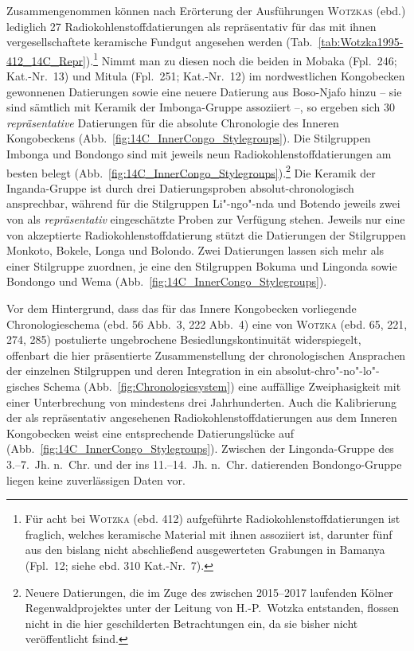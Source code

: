\begin{multicols}{2}
Zusammengenommen können nach Erörterung der Ausführungen \textsc{Wotzkas} (ebd.) lediglich 27 Radiokohlenstoffdatierungen als repräsentativ für das mit ihnen vergesellschaftete keramische Fundgut angesehen werden (Tab.~\ref{tab:Wotzka1995-412_14C_Repr}).\footnote{Für acht bei \textsc{Wotzka} (ebd. 412) aufgeführte Radiokohlenstoffdatierungen ist fraglich, welches keramische Material mit ihnen assoziiert ist, darunter fünf aus den bislang nicht abschließend ausgewerteten Grabungen in Bamanya (Fpl.~12; siehe ebd. 310 Kat.-Nr.~7).} Nimmt man zu diesen noch die beiden in Mobaka (Fpl.~246; Kat.-Nr.~13) und Mitula (Fpl.~251; Kat.-Nr.~12) im nordwestlichen Kongobecken gewonnenen Datierungen sowie eine neuere Datierung aus Boso-Njafo \parencite[Fpl.~149;][]{Kahlheber.2014} hinzu -- sie sind sämtlich mit Keramik der Imbonga-Gruppe assoziiert --, so ergeben sich 30 \textit{repräsentative} Datierungen für die absolute Chronologie des Inneren Kongobeckens (Abb.~\ref{fig:14C_InnerCongo_Stylegroups}). Die Stilgruppen Imbonga und Bondongo sind mit jeweils neun Radiokohlenstoffdatierungen am besten belegt (Abb.~\ref{fig:14C_InnerCongo_Stylegroups}).\footnote{Neuere Datierungen, die im Zuge des zwischen 2015--2017 laufenden Kölner Regenwaldprojektes unter der Leitung von H.-P.~Wotzka entstanden, flossen nicht in die hier geschilderten Betrachtungen ein, da sie bisher nicht veröffentlicht fsind.} Die Keramik der Inganda-Gruppe ist durch drei Datierungsproben absolut-chronologisch ansprechbar, während für die Stilgruppen Li"-ngo"-nda und Botendo jeweils zwei von \textcite{Wotzka.1995} als \textit{repräsentativ} eingeschätzte Proben zur Verfügung stehen. Jeweils nur eine von \textcite{Wotzka.1995} akzeptierte Radiokohlenstoffdatierung stützt die Datierungen der Stilgruppen Monkoto, Bokele, Longa und Bolondo. Zwei Datierungen lassen sich mehr als einer Stilgruppe zuordnen, je eine den Stilgruppen Bokuma und Lingonda sowie Bondongo und Wema (Abb.~\ref{fig:14C_InnerCongo_Stylegroups}).

Vor dem Hintergrund, dass das für das Innere Kongobecken vorliegende Chronologieschema (ebd. 56 Abb.~3, 222 Abb.~4) eine von \textsc{Wotzka} (ebd. 65, 221, 274, 285) postulierte ungebrochene Besiedlungskontinuität widerspiegelt, offenbart die hier präsentierte Zusammenstellung der chronologischen Ansprachen der einzelnen Stilgruppen und deren Integration in ein absolut-chro"-no"-lo"-gisches Schema (Abb.~\ref{fig:Chronologiesystem}) eine auffällige Zweiphasigkeit mit einer Unterbrechung von mindestens drei Jahrhunderten. Auch die Kalibrierung der als repräsentativ angesehenen Radiokohlenstoffdatierungen aus dem Inneren Kongobecken weist eine entsprechende Datierungslücke auf (Abb.~\ref{fig:14C_InnerCongo_Stylegroups}). Zwischen der Lingonda-Gruppe des \mbox{3.--7.~Jh.} n.~Chr. und der ins 11.--14.~Jh. n.~Chr. datierenden Bondongo-Gruppe liegen keine zuverlässigen Daten vor. 


\end{multicols}
